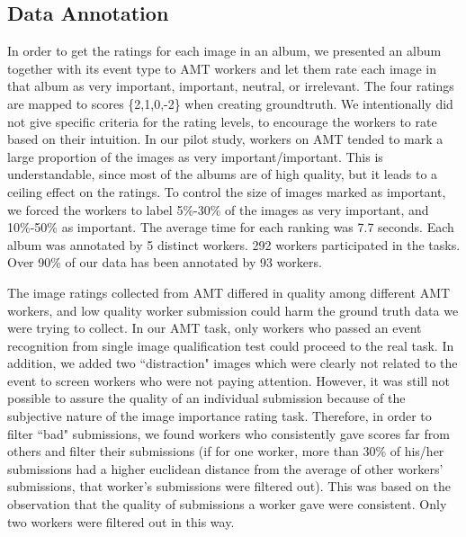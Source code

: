 \documentclass[10pt,twocolumn,letterpaper]{article}
\begin{document}
\subsection{Data Annotation}

In order to get the ratings for each image in an album, we presented an album together with its event type to AMT workers and let them rate each image in that album as very important, important, neutral, or irrelevant. The four ratings are mapped to scores \{2,1,0,-2\} when creating groundtruth. We intentionally did not give specific criteria for the rating levels, to encourage the workers to rate based on their intuition. In our pilot study, workers on AMT tended to mark a large proportion of the images as very important/important. This is understandable, since most of the albums are of high quality, but it leads to a ceiling effect on the ratings. To control the size of images marked as important, we forced the workers to label 5\%-30\% of the images as very important, and 10\%-50\% as important. The average time for each ranking was 7.7 seconds.  Each album was annotated by 5 distinct workers. 292 workers participated in the tasks. Over 90\% of our data has been annotated by 93 workers. 

The image ratings collected from AMT differed in quality among different AMT workers, and low quality worker submission could harm the ground truth data we were trying to collect. In our AMT task, only workers who passed an event recognition from single image qualification test could proceed to the real task. In addition, we added two ``distraction" images which were clearly not related to the event to screen workers who were not paying attention.  However, it was still not possible to assure the quality of an individual submission because of the subjective nature of the image importance rating task. Therefore, in order to filter ``bad" submissions, we found workers who consistently gave scores far from others and filter their submissions (if for one worker, more than 30\% of his/her submissions had a higher euclidean distance from the average of other workers' submissions, that worker's submissions were filtered out). This was based on the observation that the quality of submissions a worker gave were consistent. Only two workers were filtered out in this way.


\end{document}
